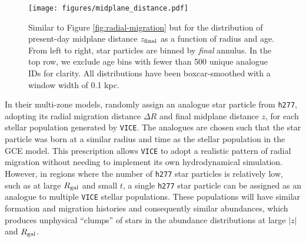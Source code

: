 \documentclass[twocolumn,twocolappendix,linenumbers]{aastex631}
\newcommand{\vice}{{\tt VICE}\xspace}
\newcommand{\hydro}{{\tt h277}\xspace}
\begin{document}
\begin{figure*}
    \centering
    \texttt{[image: figures/midplane\_distance.pdf]}
    \caption{Similar to Figure \ref{fig:radial-migration} but for the distribution of present-day midplane distance $z_{\rm final}$ as a function of radius and age. From left to right, star particles are binned by \textit{final} annulus. In the top row, we exclude age bins with fewer than 500 unique analogue IDs for clarity. All distributions have been boxcar-smoothed with a window width of 0.1 kpc.}
    \label{fig:midplane-distance}
\end{figure*}

In their multi-zone models,  randomly assign an analogue star particle from \hydro, adopting its radial migration distance $\Delta R$ and final midplane distance $z$, for each stellar population generated by \vice. The analogues are chosen such that the star particle was born at a similar radius and time as the stellar population in the GCE model. This prescription allows \vice to adopt a realistic pattern of radial migration without needing to implement its own hydrodynamical simulation. However, in regions where the number of \hydro star particles is relatively low, such as at large $R_{\rm gal}$ and small $t$, a single \hydro star particle can be assigned as an analogue to multiple \vice stellar populations. These populations will have similar formation and migration histories and consequently similar abundances, which produces unphysical ``clumps'' of stars in the abundance distributions at large $|z|$ and $R_{\rm gal}$.
\end{document}
